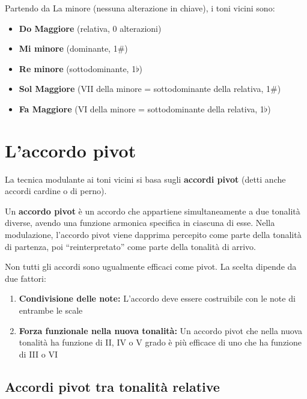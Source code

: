 \begin{esempio}
	\label{ex:toni_vicini_la_m}
	Partendo da La minore (nessuna alterazione in chiave), i toni vicini sono:
	
	\begin{itemize}
		\item \textbf{Do Maggiore} (relativa, 0 alterazioni)
		\item \textbf{Mi minore} (dominante, 1\#)
		\item \textbf{Re minore} (sottodominante, 1$\flat$)
		\item \textbf{Sol Maggiore} (VII della minore = sottodominante della relativa, 1\#)
		\item \textbf{Fa Maggiore} (VI della minore = sottodominante della relativa, 1$\flat$)
	\end{itemize}
\end{esempio}

\section{L'accordo pivot}
\label{sec:accordo_pivot}

La tecnica modulante ai toni vicini si basa sugli \textbf{accordi pivot} (detti anche accordi cardine o di perno).

\begin{definizione}
	\label{def:accordo_pivot}
	Un \textbf{accordo pivot} è un accordo che appartiene simultaneamente a due tonalità diverse, avendo una funzione armonica specifica in ciascuna di esse. Nella modulazione, l'accordo pivot viene dapprima percepito come parte della tonalità di partenza, poi ``reinterpretato'' come parte della tonalità di arrivo.
	
\end{definizione}

Non tutti gli accordi sono ugualmente efficaci come pivot. La scelta dipende da due fattori:

\begin{enumerate}
	\item \textbf{Condivisione delle note:} L'accordo deve essere costruibile con le note di entrambe le scale
	\item \textbf{Forza funzionale nella nuova tonalità:} Un accordo pivot che nella nuova tonalità ha funzione di II, IV o V grado è più efficace di uno che ha funzione di III o VI
\end{enumerate}

\subsection{Accordi pivot tra tonalità relative}
\label{subsec:pivot_relative}

